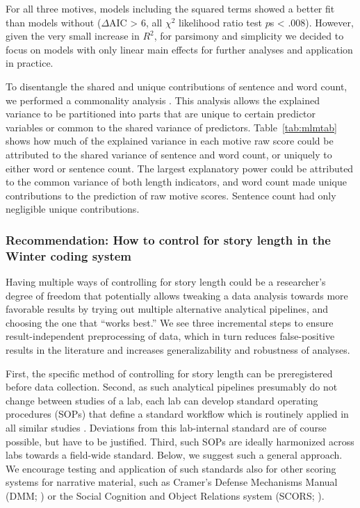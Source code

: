 \documentclass[jou,a4paper]{apa6}\usepackage[]{graphicx}\usepackage[]{color}
\begin{document}
For all three motives, models including the squared terms showed a better fit than models without ($\Delta$AIC > 6, all $\chi^2$ likelihood ratio test $p$s < .008). However, given the very small increase in $R^2$, for parsimony and simplicity we decided to focus on models with only linear main effects for further analyses and application in practice.


To disentangle the shared and unique contributions of sentence and word count, we performed a commonality analysis \parencite{nimon_r_2008}. This analysis allows the explained variance to be partitioned into parts that are unique to certain predictor variables or common to the shared variance of predictors. Table~\ref{tab:mlmtab} shows how much of the explained variance in each motive raw score could be attributed to the shared variance of sentence and word count, or uniquely to either word or sentence count. The largest explanatory power could be attributed to the common variance of both length indicators, and word count made unique contributions to the prediction of raw motive scores. Sentence count had only negligible unique contributions.


\subsubsection{Recommendation: How to control for story length in the Winter coding system}
Having multiple ways of controlling for story length could be a researcher's degree of freedom \parencite{john_measuring_2012} that potentially allows tweaking a data analysis towards more favorable results by trying out multiple alternative analytical pipelines, and choosing the one that ``works best.'' We see three incremental steps to ensure result-independent preprocessing of data, which in turn reduces false-positive results in the literature and increases generalizability and robustness of analyses. 

First, the specific method of controlling for story length can be preregistered before data collection. Second, as such analytical pipelines presumably do not change between studies of a lab, each lab can develop standard operating procedures (SOPs) that define a standard workflow which is routinely applied in all similar studies \parencite{lin_StandardOperatingProcedures_2016}. Deviations from this lab-internal standard are of course possible, but have to be justified. Third, such SOPs are ideally harmonized across labs towards a field-wide standard. Below, we suggest such a general approach. We encourage testing and application of such standards also for other scoring systems for narrative material, such as Cramer’s Defense Mechanisms Manual (DMM; ) or the Social Cognition and Object Relations system (SCORS; ).
\end{document}
